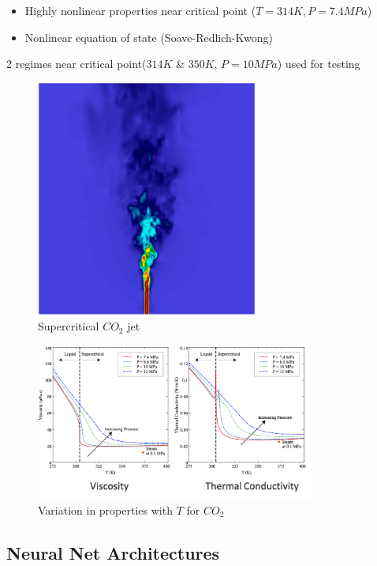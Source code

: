 \documentclass{article}
\begin{document}
	\begin{itemize}		
		\item Highly nonlinear properties near critical point ($T = 314 K, P = 7.4 MPa$)
		\item Nonlinear equation of state (Soave-Redlich-Kwong) \\
		\color{red}{Existing heuristics for refinement may be insufficient}
	\end{itemize}2 regimes near critical point($314 K$ \& $350 K$, $P = 10MPa$) used for testing 
				\begin{figure}
				 \centering
				\includegraphics[width=0.65\textwidth]{figures/sco2_jet.png}
				\caption{Supercritical $CO_2$ jet}
			\end{figure}
			\begin{figure}
			    \centering
			\includegraphics[width=0.82\textwidth]{figures/sco2nu.png}
			\caption{Variation in properties with $T$ for $CO_2$}
	\end{figure}



\subsection{Neural Net Architectures}
\end{document}
